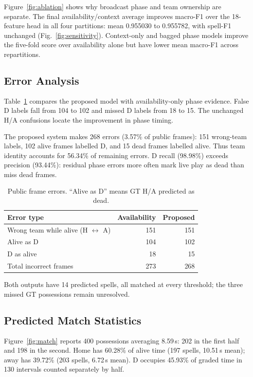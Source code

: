 \documentclass[conference,a4paper,10pt]{IEEEtran}
\begin{document}
Figure~\ref{fig:ablation} shows why broadcast phase and team ownership are
separate. The final availability/context average improves macro-F1 over the
18-feature head in all four partitions: mean 0.955030 to 0.955782, with spell-F1
unchanged (Fig.~\ref{fig:sensitivity}). Context-only and bagged phase models
improve the five-fold score over availability alone but have lower mean
macro-F1 across repartitions.

\subsection{Error Analysis}
Table~\ref{tab:errors} compares the proposed model with availability-only phase
evidence. False D labels fall from 104 to 102 and missed D labels from 18 to 15.
The unchanged H/A confusions locate the improvement in phase timing.

The proposed system makes 268 errors (3.57\% of public frames): 151 wrong-team
labels, 102 alive frames labelled D, and 15 dead frames labelled alive. Thus
team identity accounts for 56.34\% of remaining errors. D recall (98.98\%)
exceeds precision (93.44\%): residual phase errors more often mark live play
as dead than miss dead frames.

\begin{table}[!t]
\centering
\caption{Public frame errors. ``Alive as D'' means GT H/A predicted as dead.}
\label{tab:errors}
\footnotesize
\begin{tabular}{@{}lrr@{}}
\toprule
Error type & Availability & Proposed\\
\midrule
Wrong team while alive (H $\leftrightarrow$ A) & 151 & 151\\
Alive as D & 104 & 102\\
D as alive & 18 & 15\\
\midrule
Total incorrect frames & 273 & 268\\
\bottomrule
\end{tabular}
\end{table}

Both outputs have 14 predicted spells, all matched at every threshold; the
three missed GT possessions remain unresolved.

\subsection{Predicted Match Statistics}
Figure~\ref{fig:match} reports 400 possessions averaging 8.59\,s: 202 in the first
half and 198 in the second. Home has 60.28\% of alive time (197 spells,
10.51\,s mean); away has 39.72\% (203 spells, 6.72\,s mean). D occupies
45.93\% of graded time in 130 intervals counted separately by half.
\end{document}

